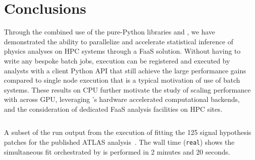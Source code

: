 \section{Conclusions}\label{sec:conclusions}

Through the combined use of the pure-Python libraries \funcX{} and \pyhf{}, we have demonstrated the ability to parallelize and accelerate statistical inference of physics analyses on HPC systems through a FaaS solution.
Without having to write any bespoke batch jobs, execution can be registered and executed by analysts with a client Python API that still achieve the large performance gains compared to single node execution that is a typical motivation of use of batch systems.
These results on CPU further motivate the study of scaling performance with \funcX{} across GPU, leveraging \pyhf{}'s hardware accelerated computational backends, and the consideration of dedicated FaaS analysis facilities on HPC sites.

\clearpage
\begin{listing}
 \inputminted{text}{src/code/funcX_demo_output.txt}
 \caption{A subset of the run output from the execution of fitting the 125 signal hypothesis patches for the published ATLAS analysis~\cite{SUSY-2019-08}.
 The wall time (\texttt{real}) shows the simultaneous fit orchestrated by \funcX{} is performed in 2 minutes and 20 seconds.}
 \label{lst:funcX_demo_output}
\end{listing}
